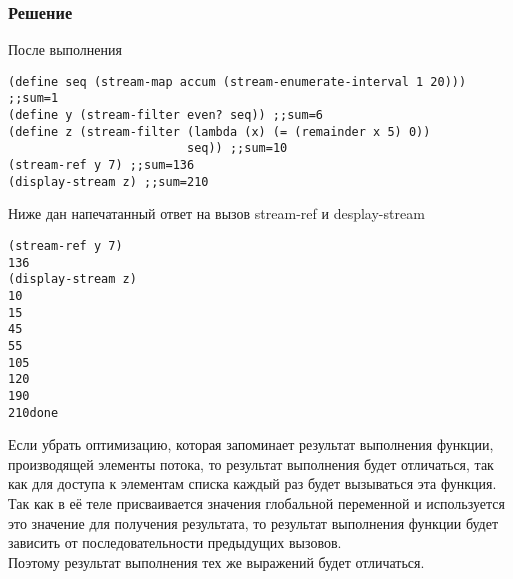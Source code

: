 \documentclass[10pt,a4paper]{article}
\begin{document}
\subsubsection*{Решение}
После выполнения
\begin{lstlisting}
(define seq (stream-map accum (stream-enumerate-interval 1 20))) ;;sum=1
(define y (stream-filter even? seq)) ;;sum=6
(define z (stream-filter (lambda (x) (= (remainder x 5) 0))
                         seq)) ;;sum=10
(stream-ref y 7) ;;sum=136
(display-stream z) ;;sum=210
\end{lstlisting}
Ниже дан напечатанный ответ на вызов stream-ref и desplay-stream
\begin{lstlisting}
(stream-ref y 7)
136
(display-stream z)
10
15
45
55
105
120
190
210done
\end{lstlisting}
Если убрать оптимизацию, которая запоминает результат выполнения
функции, производящей элементы потока, то результат выполнения будет
отличаться, так как для доступа к элементам списка каждый раз будет
вызываться эта функция. Так как в её теле присваивается
значения глобальной переменной и используется это значение для получения
результата, то результат выполнения функции будет зависить от
последовательности предыдущих вызовов.  \\
Поэтому результат выполнения тех же выражений будет отличаться.
\end{document}
